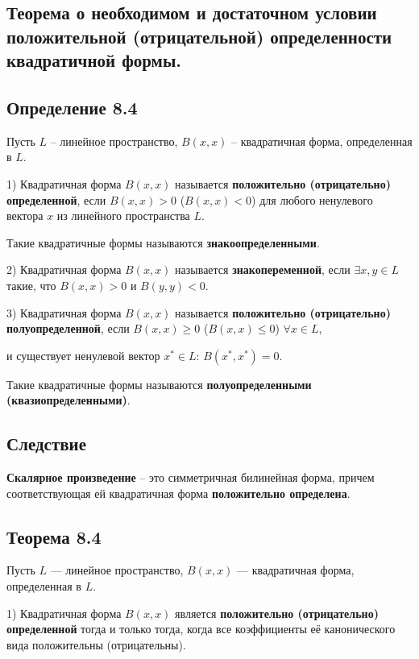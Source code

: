 {
\subsection{Теорема о необходимом и достаточном условии положительной (отрицательной) определенности квадратичной формы.}

\subsection*{Определение 8.4}

Пусть \( L \) – линейное пространство, \( B(x, x) \) – квадратичная форма, определенная в \( L \).

1) Квадратичная форма \( B(x, x) \) называется \textbf{положительно (отрицательно) определенной}, если \( B(x, x) > 0 \) (\( B(x, x) < 0 \)) для любого ненулевого вектора \( x \) из линейного пространства \( L \).

Такие квадратичные формы называются \textbf{знакоопределенными}.

2) Квадратичная форма \( B(x, x) \) называется \textbf{знакопеременной}, если \( \exists x, y \in L \) такие, что \( B(x, x) > 0 \) и \( B(y, y) < 0 \).

3) Квадратичная форма \( B(x, x) \) называется \textbf{положительно (отрицательно) полуопределенной}, если \( B(x, x) \geq 0 \) (\( B(x, x) \leq 0 \)) \( \forall x \in L \),

и существует ненулевой вектор \( x^* \in L \): \( B(x^*, x^*) = 0 \).

Такие квадратичные формы называются \textbf{полуопределенными (квазиопределенными)}.

\subsection*{Следствие}

\textbf{Скалярное произведение} – это симметричная билинейная форма, причем соответствующая ей квадратичная форма \textbf{положительно определена}.

\subsection*{Теорема 8.4}

Пусть \( L \) — линейное пространство, \( B(x, x) \) — квадратичная форма, определенная в \( L \).

1) Квадратичная форма \( B(x, x) \) является \textbf{положительно (отрицательно) определенной} тогда и только тогда, когда все коэффициенты её канонического вида положительны (отрицательны).

}
